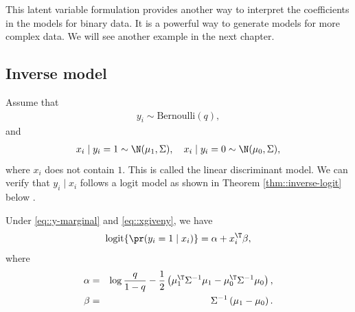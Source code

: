 This latent variable formulation provides another way to interpret the coefficients in the models for binary data. It is a powerful way to generate models for more complex data. We will see another example in the next chapter. 




\subsection{Inverse model}\label{subsec:Inverse-model-gaussian-mixture}

Assume that 
\begin{eqnarray}
y_{i}\sim\text{Bernoulli}(q),
\label{eq::y-marginal}
\end{eqnarray}
and
\begin{eqnarray}
x_{i}\mid y_{i}=1\sim\N(\mu_{1},\Sigma),\quad x_{i}\mid y_{i}=0\sim\N(\mu_{0},\Sigma),
\label{eq::xgiveny}
\end{eqnarray} 
where $x_i$ does not contain $1$.
This is called the linear discriminant model. 
We can verify that $y_{i}\mid x_{i}$ follows a logit model as shown in Theorem \ref{thm::inverse-logit} below \citep{cornfield1961quantal, cornfield1962joint}.  


\begin{theorem}
\label{thm::inverse-logit}
Under \eqref{eq::y-marginal} and \eqref{eq::xgiveny}, we have
$$
\textup{logit}\{  \pr(y_i =1\mid x_i) \} = \alpha + x_i^{\T} \beta, 
$$
where
\begin{eqnarray}
\alpha &=& \log\frac{q}{1-q}-\frac{1}{2}\left(\mu_{1}^{\T}\Sigma^{-1}\mu_{1}-\mu_{0}^{\T}\Sigma^{-1}\mu_{0}\right)  ,\\ 
\beta  &=& \Sigma^{-1}\left(\mu_{1}-\mu_{0}\right) . \label{eq::alpha-beta-lda}
\end{eqnarray}
\end{theorem}

